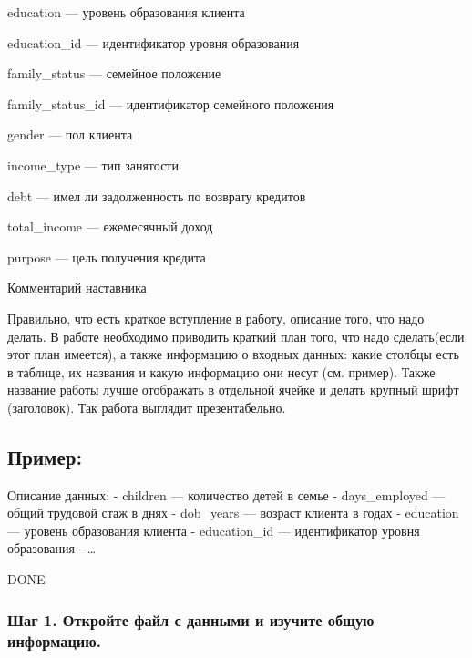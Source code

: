\documentclass[11pt]{article}
\begin{document}
education --- уровень образования клиента

education\_id --- идентификатор уровня образования

family\_status --- семейное положение

family\_status\_id --- идентификатор семейного положения

gender --- пол клиента

income\_type --- тип занятости

debt --- имел ли задолженность по возврату кредитов

total\_income --- ежемесячный доход

purpose --- цель получения кредита

    Комментарий наставника

Правильно, что есть краткое вступление в работу, описание того, что надо
делать. В работе необходимо приводить краткий план того, что надо
сделать(если этот план имеется), а также информацию о входных данных:
какие столбцы есть в таблице, их названия и какую информацию они несут
(см. пример). Также название работы лучше отображать в отдельной ячейке
и делать крупный шрифт (заголовок). Так работа выглядит презентабельно.

\hypertarget{ux43fux440ux438ux43cux435ux440}{%
\subsection{Пример:}\label{ux43fux440ux438ux43cux435ux440}}

Описание данных: - children --- количество детей в семье -
days\_employed --- общий трудовой стаж в днях - dob\_years --- возраст
клиента в годах - education --- уровень образования клиента -
education\_id --- идентификатор уровня образования - \ldots{}

    DONE

    \hypertarget{ux448ux430ux433-1.-ux43eux442ux43aux440ux43eux439ux442ux435-ux444ux430ux439ux43b-ux441-ux434ux430ux43dux43dux44bux43cux438-ux438-ux438ux437ux443ux447ux438ux442ux435-ux43eux431ux449ux443ux44e-ux438ux43dux444ux43eux440ux43cux430ux446ux438ux44e.}{%
\subsubsection{Шаг 1. Откройте файл с данными и изучите общую
информацию.}\label{ux448ux430ux433-1.-ux43eux442ux43aux440ux43eux439ux442ux435-ux444ux430ux439ux43b-ux441-ux434ux430ux43dux43dux44bux43cux438-ux438-ux438ux437ux443ux447ux438ux442ux435-ux43eux431ux449ux443ux44e-ux438ux43dux444ux43eux440ux43cux430ux446ux438ux44e.}}
\end{document}
